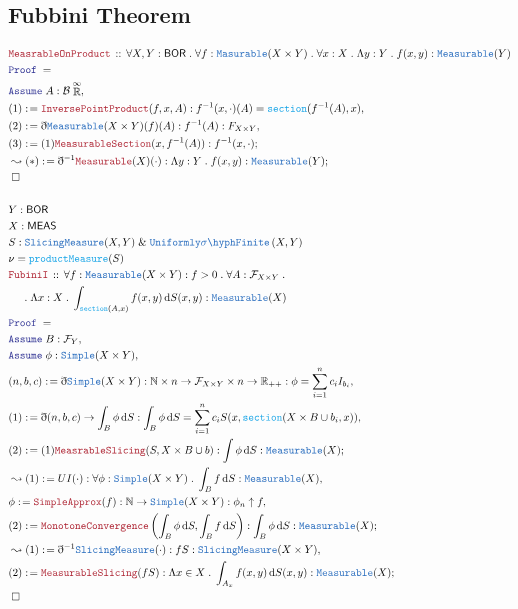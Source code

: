 \documentclass[12pt]{scrartcl}
\newcommand{\TYPE}[1]{\textcolor{NavyBlue}{\mathtt{#1}}}
\newcommand{\FUNC}[1]{\textcolor{Cerulean}{\mathtt{#1}}}
\newcommand{\LOGIC}[1]{\textcolor{Blue}{\mathtt{#1}}}
\newcommand{\THM}[1]{\textcolor{Maroon}{\mathtt{#1}}}
\renewcommand{\.}{\; . \;}
\newcommand{\de}{: \kern 0.1pc =}
\newcommand{\Theorem}[2]{& \THM{#1} \, :: \, #2 \\ & \Proof = \\ }
\newcommand{\NewLine}{\\ & \kern 1pc}
\renewcommand{\And}{\; \& \;}
\newcommand{\ForEach}[3]{\forall #1 : #2 \. #3 }
\newcommand{\Reals}{\mathbb{R} }
\newcommand{\Nat}{\mathbb{N} }
\newcommand{\EReals}{\stackrel{\mathclap{\infty}}{\mathbb{R}}}
\newcommand{\Say}[3]{& #1 \de #2 : #3, \\}
\newcommand{\Conclude}[3]{& #1 \de #2 : #3; \\}
\newcommand{\Derive}[3]{& \leadsto #1 \de #2 : #3, \\}
\newcommand{\DeriveConclude}[3]{& \leadsto #1 \de #2 : #3 ; \\}
\newcommand{\A}{\LOGIC{Assume} \;}
\newcommand{\Assume}[2]{& \A #1 : #2, \\}
\newcommand{\QED}{\; \square}
\newcommand{\EndProof}{& \QED \\}
\newcommand{\ByDef}{\eth}
\newcommand{\Proof}{\LOGIC{Proof} \; }
\newcommand{\SF}[1]{\TYPE{\sigma \hyph  Finite}\left( #1 \right) }
\newcommand{\BOR}{\mathsf{BOR}}
\newcommand{\MEAS}{\mathsf{MEAS}}
\newcommand{\F}{\mathcal{F}}
\newcommand{\B}{\mathcal{B}}
\begin{document}
\subsection{Fubbini Theorem }
\begin{align*}
\Theorem{MeasrableOnProduct}{
\ForEach{X,Y}{\BOR}{
\ForEach{f}{\TYPE{Masurable}(X \times Y) }{
\ForEach{x}{X}{
\Lambda y : Y \. f(x,y) : \TYPE{Measurable}(Y)
}}}}
\Assume{A}{\B \EReals}
\Say{(1)}{ \THM{InversePointProduct}(f,x,A)}{f^{-1}(x,\cdot)(A) = \FUNC{section}(f^{-1}(  A ),x) }
\Say{(2)}{ \ByDef \TYPE{Measurable}(X \times Y)(f)(A)  }{ f^{-1}(A) : F_{X \times Y}}
\Conclude{(3)}{ (1)\THM{MeasurableSection}(x,f^{-1}(A))}{  f^{-1}(x,\cdot)   }
\DeriveConclude{(*)}{\ByDef^{-1}\THM{Measurable}(X)(\cdot)}{\Lambda y : Y \. f(x,y) : \TYPE{Measurable}(Y)}
\EndProof
\\
& Y : \BOR
\\
& X : \MEAS
\\
& S : \TYPE{SlicingMeasure}(X,Y) \And \TYPE{Uniformly}\SF{X,Y}
\\ 
& \nu = \FUNC{productMeasure}(S)
\\
\Theorem{FubiniI}{ 
\ForEach{f}{\TYPE{Measurable}(X \times Y) : f > 0}{
\ForEach{A}{\F_{X \times Y} \. \NewLine}{
\Lambda x : X \. \int_{\FUNC{section}(A,x)} f(x,y)  \, \mathrm{d} S(x, y) : \TYPE{Measurable}(X)
}}}
\Assume{B}{\F_Y}
\Assume{\phi}{\TYPE{Simple}(X \times Y)}
\Say{(n,b,c)}{\ByDef \TYPE{Simple}(X \times Y)}{ \Nat \times n \to \F_{X \times Y} \times n \to \Reals_{++} : \phi = \sum^n_{i=1}c_iI_{b_i} }
\Say{(1)}{\ByDef(n,b,c) \to \int_B \phi \, \mathrm{d}S}{\int_B \phi \, \mathrm{d}S = \sum^n_{i = 1} c_i S(x,  \FUNC{section}( X \times B \cup b_i,x)) }
\Conclude{(2)}{(1)\THM{MeasrableSlicing}(S, X \times B \cup b)}{ \int \phi \, \mathrm{d}S : \TYPE{Measurable}(X)}
\Derive{(1)}{  UI(\cdot)}{\forall \phi : \TYPE{Simple}(X \times Y) \. \int_B f \,  \mathrm{d}S : \TYPE{Measurable}(X)}
\Say{\phi}{ \THM{SimpleApprox}(f) }{ \Nat \to \TYPE{Simple}(X \times Y) : \phi_n \uparrow f   }
\Conclude{(2)}{ \THM{MonotoneConvergence} \left( \int_B \phi \, \mathrm{d} S , \int_B f \, \mathrm{d} S \right)}{ \int_B \phi \, \mathrm{d} S : \TYPE{Measurable}(X)}
\Derive{(1)}{ \ByDef^{-1}\TYPE{SlicingMeasure}(\cdot) }{ fS : \TYPE{SlicingMeasure}(X \times Y) }
\Conclude{(2)}{\THM{MeasurableSlicing}(fS)}{ \Lambda x \in X \. \int_{A_x} f(x,y) \, \mathrm{d}S(x, y) : \TYPE{Measurable}(X) }
\EndProof
\end{align*}
\newpage
\end{document}
